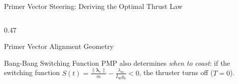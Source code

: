 \documentclass[aspectratio=169, 10pt]{beamer}
\begin{document}
\begin{frame}{Primer Vector Steering: Deriving the Optimal Thrust Law}
\begin{columns}[T]
\begin{column}{0.47\textwidth}
\begin{block}{Primer Vector Alignment Geometry}
            \end{block}
            \vspace{-0.18cm}
            \begin{alertblock}{Bang-Bang Switching Function}
                \scriptsize
                PMP also determines \textit{when to coast}: if the switching function $S(t) = \frac{\|\boldsymbol{\lambda}_v\|}{m} - \frac{\lambda_m}{I_{\text{sp}}g_0} < 0$, the thruster turns off ($T = 0$).
            \end{alertblock}
        \end{column}
    \end{columns}
\end{frame}
\end{document}
